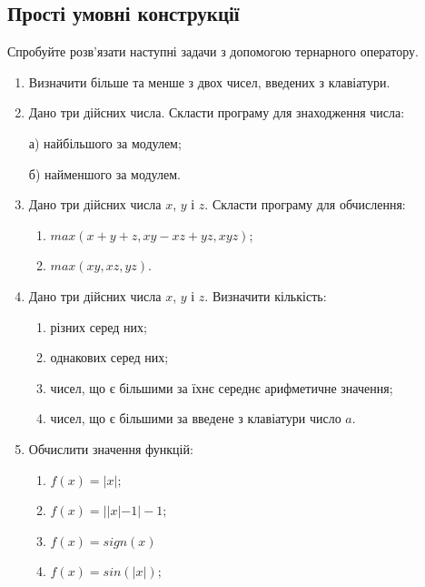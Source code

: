\documentclass[]{article}
\makeatletter
\newcommand{\xslalph}[1]{\expandafter\@xslalph\csname c@#1\endcsname}
\newcommand{\@xslalph}[1]{%
    \ifcase#1\or а\or б\or в\or г\or д\or e\or є\or ж\or з\or i%
    \or й\or к\or л\or м\or н\or о\or п\or р\or с\or т%
    \or у\or ф\or х\or ц\or ч\or ш\or ю\or я\or аа\or бб\or вв %
    \else\@ctrerr\fi%
}
\makeatother
\begin{document}
\subsection {Прості умовні конструкції}


Спробуйте розв'язати наступні задачи з допомогою тернарного оператору.
\begin{enumerate}
\item
Визначити більше та менше з двох чисел, введених з клавіатури.
\item
Дано три дійсних числа. Скласти програму для знаходження числа:

а) найбільшого за модулем;

б) найменшого за модулем.

\item
Дано три дійсних числа $x$, $y$ і $z$. Скласти програму для
  обчислення:
\begin{enumerate}[label=\xslalph*)]
\item
  \(max(x + y + z,xy- xz + yz,xyz)\);
\item
  \(max(xy,xz,yz)\).
\end{enumerate}

\item
Дано три дійсних числа $x$, $y$ і $z$. Визначити кількість:
\begin{enumerate}[label=\xslalph*)]
\item різних серед них; 
\item однакових серед них;
\item чисел, що є більшими за їхнє середнє арифметичне значення;
\item чисел, що є більшими за введене з клавіатури число \(a\).
\end{enumerate}

\item
Обчислити значення функцій:
  \begin{multicols}{2}
\begin{enumerate}[label=\xslalph*)]
\item \(f(x) = |x|;\) \item \(f(x) = ||x| - 1| - 1;\)
\item \(f(x) = sign(x)\) \item \(f(x) = sin(|x|);\)
\end{enumerate}
  \end{multicols}

\end{enumerate}
\end{document}
